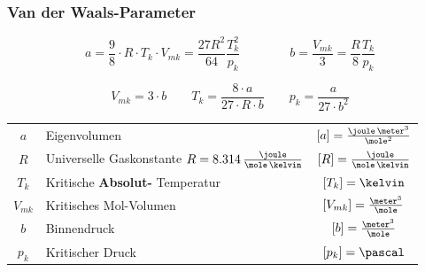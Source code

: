 \subsubsection{Van der Waals-Parameter}

\vspace{-0.2cm}
\[\boxed{ a = \frac{9}{8} \cdot R \cdot T_k \cdot V_{mk}  = \frac{27 R^2}{64} \frac{T_k^2}{p_k}} 
\qquad \qquad  \boxed{ b = \frac{V_{mk}}{3} = \frac{R}{8} \frac{T_k}{p_k}}\]

\[\boxed{ V_{mk} = 3 \cdot b } \quad \quad 
\boxed{ T_k = \frac{8 \cdot a}{27 \cdot R \cdot b} } 
\quad \quad  \boxed{ p_k = \frac{a}{27 \cdot b^2} } \]


\renewcommand{\arraystretch}{1.3}
\begin{tabular}{c l c}
	$a$ 		& Eigenvolumen 																	& $[a] = \frac{\joule \, \meter^3}{\mole^2}$ 	\\
	$R$			& Universelle Gaskonstante $R = 8.314 \, \frac{\joule}{\mole \, \kelvin}$ 		& $[R] = \frac{\joule}{\mole \, \kelvin}$ 		\\
	$T_k$ 		& Kritische \textbf{Absolut-} Temperatur 										& $[T_k] = \kelvin$ 							\\
	$V_{mk}$ 	& Kritisches Mol-Volumen 														& $[V_{mk}] = \frac{\meter^3}{\mole}$ 			\\
	$b$ 		& Binnendruck 																	& $[b] = \frac{\meter^3}{\mole}$ 				\\
	$p_k$ 		& Kritischer Druck 																& $[p_k] = \pascal$
\end{tabular}
\renewcommand{\arraystretch}{1}

